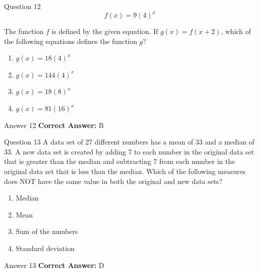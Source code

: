 \documentclass{beamer}
\begin{document}
\begin{frame}{Question 12}
\small
\[f(x) = 9(4)^x\]

The function \(\displaystyle f\) is defined by the given equation. If \(\displaystyle g(x) = f(x + 2)\), which of the following equations defines the function \(\displaystyle g\)?
\vspace{0.35cm}
\begin{enumerate}
    \item[A.] \(\displaystyle g(x) = 18(4)^x\)
    \item[B.] \(\displaystyle g(x) = 144(4)^x\)
    \item[C.] \(\displaystyle g(x) = 18(8)^x\)
    \item[D.] \(\displaystyle g(x) = 81(16)^x\)
\end{enumerate}

\end{frame}
\begin{frame}{Answer 12}
\small
\textbf{Correct Answer:} B
\end{frame}

\begin{frame}{Question 13}
\small
A data set of 27 different numbers has a mean of 33 and a median of 33. A new data set is created by adding 7 to each number in the original data set that is greater than the median and subtracting 7 from each number in the original data set that is less than the median. Which of the following measures does NOT have the same value in both the original and new data sets?
\vspace{0.35cm}
\begin{enumerate}
    \item[A.] Median
    \item[B.] Mean
    \item[C.] Sum of the numbers
    \item[D.] Standard deviation
\end{enumerate}

\end{frame}
\begin{frame}{Answer 13}
\small
\textbf{Correct Answer:} D
\end{frame}
\end{document}
